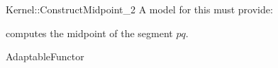\begin{ccRefFunctionObjectConcept}{Kernel::ConstructMidpoint_2}
A model for this must provide:


 {computes the midpoint of the segment $pq$.}

\ccRefines
AdaptableFunctor

\ccSeeAlso
{}\\

\end{ccRefFunctionObjectConcept}

